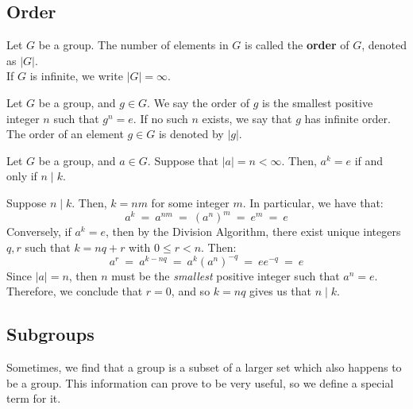 \documentclass{article}
\begin{document}
\subsection{Order}

\begin{defn}
Let $ G $ be a group. The number of elements in $ G $ is called the \textbf{order} of $ G $, denoted as $ |G| $. \\
If $ G $ is infinite, we write $ |G| = \infty $.
\end{defn}

\begin{defn}
Let $ G $ be a group, and $ g \in G $. We say the order of $ g $ is the smallest positive integer $ n $ such that $ g^{n} = e $. If no such $ n $ exists, we say that $ g $ has infinite order. \\
The order of an element $ g \in G $ is denoted by $ |g| $. 
\end{defn}

\newpage
\begin{thm}
Let $ G $ be a group, and $ a \in G $. Suppose that $ |a| = n < \infty $. Then, $ a^{k} = e $ if and only if $ n \mid k $.
\end{thm}

\begin{pf}[source=Primary Source Material]
Suppose $ n \mid k $. Then, $ k = nm $ for some integer $ m $. In particular, we have that:
\begin{equation*}
a^{k} \ = \ a^{nm} \ = \ (a^{n})^{m} \ = \ e^{m} \ = \ e
\end{equation*}
Conversely, if $ a^{k} = e $, then by the Division Algorithm, there exist unique integers $ q, r $ such that $ k = nq + r $ with $ 0 \leq r < n $. Then:
\begin{equation*}
a^{r} \ = \ a^{k - nq} \ = \ a^{k}(a^{n})^{-q} \ = \ ee^{-q} \ = \ e
\end{equation*}
Since $ |a| = n $, then $ n $ must be the \textit{smallest} positive integer such that $ a^{n} = e $. Therefore, we conclude that $ r = 0 $, and so $ k = nq $ gives us that $ n \mid k $.
\end{pf}

\subsection{Subgroups}

Sometimes, we find that a group is a subset of a larger set which also happens to be a group. This information can prove to be very useful, so we define a special term for it.
\end{document}
